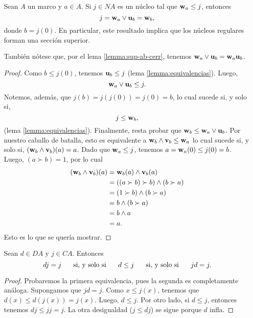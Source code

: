 \begin{lemma}
    Sean $A$ un marco y $a\in A$.
    Si $j\in NA$ es un núcleo tal que $\mathbf w_{a}\leq j$, entonces
    \[
        j = \mathbf w_{a} \vee\mathbf u_{b} = \mathbf w_{b}
    ,\]
    donde $b=j(0)$.
    En particular, este resultado implica que los núcleos
    regulares forman una sección superior.
    
    También nótese que, por el lema \ref{lemma:sup-ab-cerr},
    tenemos $\mathbf w_{a} \vee\mathbf u_{b} = \mathbf w_{a}\mathbf u_{b}$.
\end{lemma}
\begin{proof}
    Como $b\leq j(0)$, tenemos
    $\mathbf u_{b}\leq j$ (lema \ref{lemma:equivalencias}).
    Luego,
    \[
        \mathbf w_{a}\vee\mathbf u_{b}\leq j
    .\]
    Notemos, además, que $j(b)=j(j(0))=j(0)=b$,
    lo cual sucede si, y solo si,
    \[
        j \leq \mathbf w_{b}
    ,\]
    (lema \ref{lemma:equivalencias}). Finalmente, resta probar que
    $\mathbf w_{b}\leq \mathbf w_{a}\vee\mathbf u_{b}$.
    Por nuestro caballo de batalla,
    esto es equivalente a $\mathbf w_{b}\wedge\mathbf v_{b}\leq \mathbf w_{a}$
    lo cual sucede si, y solo si, $(\mathbf w_{b}\wedge\mathbf v_{b})(a)=a$.
    Dado que $\mathbf w_{a}\leq j$, tenemos
    $a=\mathbf w_{a}(0)\leq j(0)=b$.
    Luego, $(a\succ b)=1$, por lo cual
    \begin{align*}
        (\mathbf w_{b}\wedge\mathbf v_{b})(a)
        &= \mathbf w_{b}(a)\wedge \mathbf v_{b}(a) \\
        &= ((a\succ b)\succ b)\wedge (b\succ a) \\
        &= (1\succ b) \wedge (b\succ a)\\
        &= b \wedge (b\succ a) \\
        &= b\wedge a \\
        &= a.
    \end{align*}
    Esto es lo que se quería mostrar.
\end{proof}


\begin{lemma}
    Sean $d\in DA$ y $j\in CA$.
    Entonces
    \[
        dj=j \hspace{5mm}\text{ si, y solo si }\hspace{5mm} d\leq j \hspace{5mm}\text{ si, y solo si }\hspace{5mm} jd=j
    .\]
\end{lemma}
\begin{proof}
    Probaremos la primera equivalencia,
    pues la segunda es completamente análoga.
    Supongamos que $jd=j$.
    Como $x\leq j(x)$, tenemos que $d(x)\leq d(j(x))=j(x)$.
    Luego, $d\leq j$.
    Por otro lado, si $d\leq j$, entonces tenemos
    $dj\leq jj=j$.
    La otra desigualdad ($j\leq dj$) se sigue porque $d$ infla.
\end{proof}

